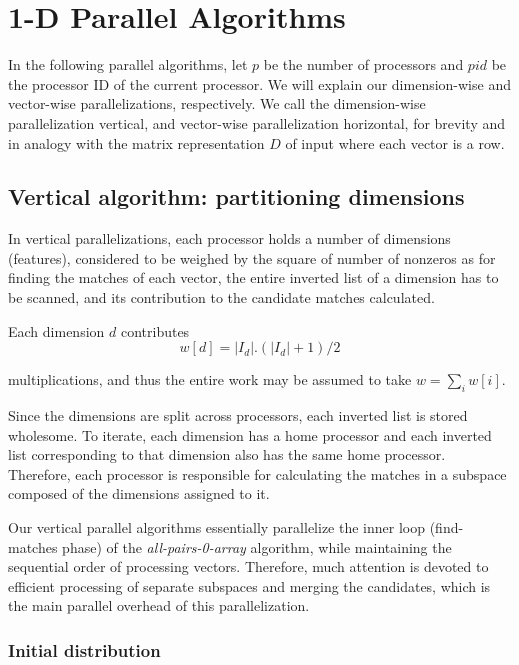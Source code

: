 \documentclass{comjnl}
\newcommand{\var}[1]{\mbox{\textsl{#1}}} %
\begin{document}
\section{1-D Parallel Algorithms}
\label{sec:1dpar}

In the following parallel algorithms, let $p$ be the number of
processors and $pid$ be the processor ID of the current processor.  We
will explain our dimension-wise and vector-wise parallelizations,
respectively. We call the dimension-wise parallelization vertical, and
vector-wise parallelization horizontal, for brevity and in analogy
with the matrix representation $D$ of input where each vector is a row.

\subsection{Vertical algorithm: partitioning dimensions}

In vertical parallelizations, each processor holds a number of
dimensions (features), considered to be weighed by the square of
number of nonzeros as for finding the matches of each vector, the
entire inverted list of a dimension has to be scanned, and its
contribution to the candidate matches calculated. 

Each dimension $d$ contributes
\begin{displaymath}
w[d] = |I_d|.(|I_d|+1)/2
\end{displaymath}

multiplications, and thus the entire work may be assumed to take $w =
\sum_i w[i]$.

Since the dimensions are
split across processors, each inverted list is stored wholesome.
To iterate, each dimension has a home processor and each inverted list
corresponding to that dimension also has the same home processor. 
Therefore, each processor is responsible
for calculating the matches in a subspace composed of the dimensions
assigned to it.

Our vertical parallel algorithms essentially parallelize the
inner loop (find-matches phase) of the \var{all-pairs-0-array} algorithm,
while maintaining the sequential order of processing vectors.
Therefore, much attention is devoted to efficient processing of
separate subspaces and merging the candidates, which is the main
parallel overhead of this parallelization.

\subsubsection{Initial distribution}
\end{document}
